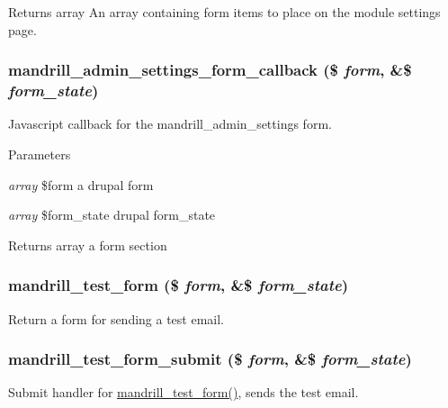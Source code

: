 \begin{DoxyReturn}{Returns}
array An array containing form items to place on the module settings page. 
\end{DoxyReturn}
\hypertarget{mandrill_8admin_8inc_aad599427ae550bd4eb563a125cb0f0d7}{
\subsubsection[{mandrill\_\-admin\_\-settings\_\-form\_\-callback}]{\setlength{\rightskip}{0pt plus 5cm}mandrill\_\-admin\_\-settings\_\-form\_\-callback (\$ {\em form}, \/  \&\$ {\em form\_\-state})}}
\label{mandrill_8admin_8inc_aad599427ae550bd4eb563a125cb0f0d7}
Javascript callback for the mandrill\_\-admin\_\-settings form.


\begin{DoxyParams}{Parameters}
\item[{\em array}]\$form a drupal form \item[{\em array}]\$form\_\-state drupal form\_\-state\end{DoxyParams}
\begin{DoxyReturn}{Returns}
array a form section 
\end{DoxyReturn}
\hypertarget{mandrill_8admin_8inc_a11577b4c1bb900bbdea89e9d1b0065f2}{
\subsubsection[{mandrill\_\-test\_\-form}]{\setlength{\rightskip}{0pt plus 5cm}mandrill\_\-test\_\-form (\$ {\em form}, \/  \&\$ {\em form\_\-state})}}
\label{mandrill_8admin_8inc_a11577b4c1bb900bbdea89e9d1b0065f2}
Return a form for sending a test email. \hypertarget{mandrill_8admin_8inc_a0bc4ea8ade8651cdc39af842f904906a}{
\subsubsection[{mandrill\_\-test\_\-form\_\-submit}]{\setlength{\rightskip}{0pt plus 5cm}mandrill\_\-test\_\-form\_\-submit (\$ {\em form}, \/  \&\$ {\em form\_\-state})}}
\label{mandrill_8admin_8inc_a0bc4ea8ade8651cdc39af842f904906a}
Submit handler for \hyperlink{mandrill_8admin_8inc_a11577b4c1bb900bbdea89e9d1b0065f2}{mandrill\_\-test\_\-form()}, sends the test email. 